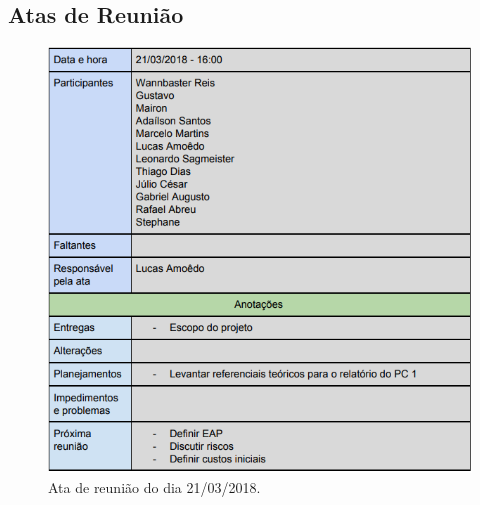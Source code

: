 \begin{apendicesenv}

\partapendices

\chapter{Atas de Reunião}

\begin{figure}[H]
	\centering
	\includegraphics[width=15cm]{figuras/apendice_a.png}
	\caption{Ata de reunião do dia 21/03/2018.
	} \label{apendice_a}
\end{figure}


\end{apendicesenv}
